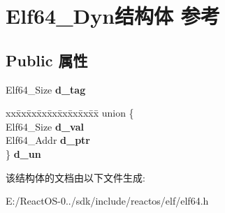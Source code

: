 \hypertarget{struct_elf64___dyn}{}\section{Elf64\+\_\+\+Dyn结构体 参考}
\label{struct_elf64___dyn}
\subsection*{Public 属性}
\begin{DoxyCompactItemize}
\item 
\mbox{\label{struct_elf64___dyn_aaf9163bf3b988a1fe48ac82ab0a6cce7}} 
Elf64\+\_\+\+Size {\bfseries d\+\_\+tag}
\item 
\mbox{\label{struct_elf64___dyn_a74bef1f2c530c865428adefc11461a5a}} 
\begin{tabbing}
xx\=xx\=xx\=xx\=xx\=xx\=xx\=xx\=xx\=\kill
union \{\\
\>Elf64\_Size {\bfseries d\_val}\\
\>Elf64\_Addr {\bfseries d\_ptr}\\
\} {\bfseries d\_un}\\

\end{tabbing}\end{DoxyCompactItemize}


该结构体的文档由以下文件生成\+:\begin{DoxyCompactItemize}
\item 
E\+:/\+React\+O\+S-\/0../sdk/include/reactos/elf/elf64.\+h\end{DoxyCompactItemize}
